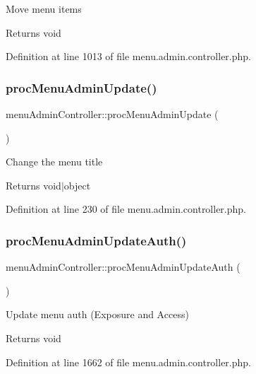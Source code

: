 Move menu items \begin{DoxyReturn}{Returns}
void 
\end{DoxyReturn}


Definition at line 1013 of file menu.\+admin.\+controller.\+php.

\mbox{\label{classmenuAdminController_a5069ab275f8531a71d6f14b08e4bc778}} 
\subsubsection{\texorpdfstring{proc\+Menu\+Admin\+Update()}{procMenuAdminUpdate()}}
{\footnotesize\ttfamily menu\+Admin\+Controller\+::proc\+Menu\+Admin\+Update (\begin{DoxyParamCaption}{ }\end{DoxyParamCaption})}

Change the menu title \begin{DoxyReturn}{Returns}
void$\vert$object 
\end{DoxyReturn}


Definition at line 230 of file menu.\+admin.\+controller.\+php.

\mbox{\label{classmenuAdminController_aa7ae548464c3919b04a2153b6f9f2459}} 
\subsubsection{\texorpdfstring{proc\+Menu\+Admin\+Update\+Auth()}{procMenuAdminUpdateAuth()}}
{\footnotesize\ttfamily menu\+Admin\+Controller\+::proc\+Menu\+Admin\+Update\+Auth (\begin{DoxyParamCaption}{ }\end{DoxyParamCaption})}

Update menu auth (Exposure and Access) \begin{DoxyReturn}{Returns}
void 
\end{DoxyReturn}


Definition at line 1662 of file menu.\+admin.\+controller.\+php.


